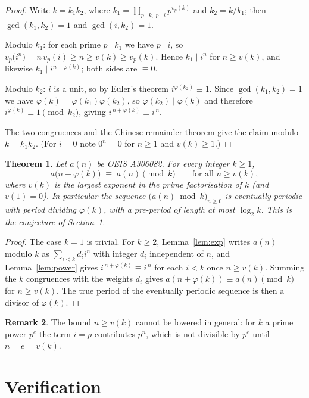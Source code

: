 \documentclass[11pt,a4paper]{article}
\theoremstyle{plain}
\newtheorem{theorem}{Theorem}
\theoremstyle{definition}
\newtheorem{remark}[theorem]{Remark}
\begin{document}
\begin{proof}
Write $k=k_1k_2$, where $k_1=\prod_{p\mid k,\ p\mid i}p^{v_p(k)}$ and $k_2=k/k_1$; then
$\gcd(k_1,k_2)=1$ and $\gcd(i,k_2)=1$.

Modulo $k_1$: for each prime $p\mid k_1$ we have $p\mid i$, so
$v_p\bigl(i^{n}\bigr)=n\,v_p(i)\ge n\ge v(k)\ge v_p(k)$. Hence $k_1\mid i^{n}$ for
$n\ge v(k)$, and likewise $k_1\mid i^{n+\varphi(k)}$; both sides are $\equiv 0$.

Modulo $k_2$: $i$ is a unit, so by Euler's theorem $i^{\varphi(k_2)}\equiv 1$. Since
$\gcd(k_1,k_2)=1$ we have $\varphi(k)=\varphi(k_1)\varphi(k_2)$, so
$\varphi(k_2)\mid\varphi(k)$ and therefore $i^{\varphi(k)}\equiv 1 \pmod{k_2}$, giving
$i^{\,n+\varphi(k)}\equiv i^{\,n}$.

The two congruences and the Chinese remainder theorem give the claim modulo $k=k_1k_2$.
(For $i=0$ note $0^{n}=0$ for $n\ge 1$ and $v(k)\ge1$.)
\end{proof}

\begin{theorem}\label{thm:main}
Let $a(n)$ be OEIS A306082. For every integer $k\ge1$,
\[
a\bigl(n+\varphi(k)\bigr)\;\equiv\;a(n)\pmod{k}\qquad\text{for all } n\ge v(k),
\]
where $v(k)$ is the largest exponent in the prime factorisation of $k$ (and $v(1)=0$).
In particular the sequence $\bigl(a(n)\bmod k\bigr)_{n\ge0}$ is eventually periodic with
period dividing $\varphi(k)$, with a pre-period of length at most $\log_2 k$. This is the
conjecture of Section~1.
\end{theorem}

\begin{proof}
The case $k=1$ is trivial. For $k\ge2$, Lemma~\ref{lem:exp} writes $a(n)$ modulo $k$ as
$\sum_{i<k}d_i i^{n}$ with integer $d_i$ independent of $n$, and Lemma~\ref{lem:power}
gives $i^{\,n+\varphi(k)}\equiv i^{\,n}$ for each $i<k$ once $n\ge v(k)$. Summing the
$k$ congruences with the weights $d_i$ gives
$a(n+\varphi(k))\equiv a(n)\pmod k$ for $n\ge v(k)$. The true period of the eventually
periodic sequence is then a divisor of $\varphi(k)$.
\end{proof}

\begin{remark}
The bound $n\ge v(k)$ cannot be lowered in general: for $k$ a prime power $p^{e}$ the
term $i=p$ contributes $p^{n}$, which is not divisible by $p^{e}$ until $n=e=v(k)$.
\end{remark}

\section{Verification}
\end{document}
